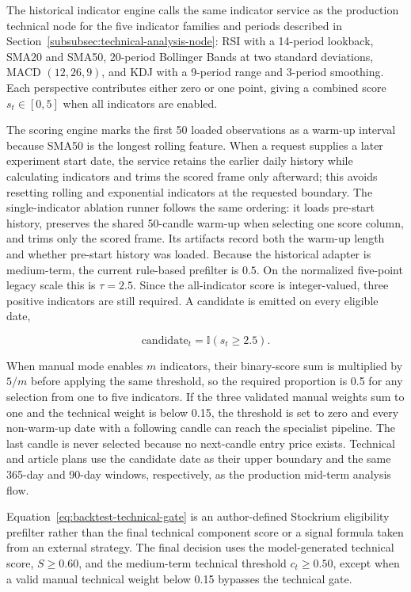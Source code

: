 The historical indicator engine calls the same indicator service as the production technical node for the five indicator families and periods described in Section~\ref{subsubsec:technical-analysis-node}: RSI with a 14-period lookback, SMA20 and SMA50, 20-period Bollinger Bands at two standard deviations, MACD $(12,26,9)$, and KDJ with a 9-period range and 3-period smoothing. Each perspective contributes either zero or one point, giving a combined score $s_t\in[0,5]$ when all indicators are enabled.

The scoring engine marks the first 50 loaded observations as a warm-up interval because SMA50 is the longest rolling feature. When a request supplies a later experiment start date, the service retains the earlier daily history while calculating indicators and trims the scored frame only afterward; this avoids resetting rolling and exponential indicators at the requested boundary. The single-indicator ablation runner follows the same ordering: it loads pre-start history, preserves the shared 50-candle warm-up when selecting one score column, and trims only the scored frame. Its artifacts record both the warm-up length and whether pre-start history was loaded. Because the historical adapter is medium-term, the current rule-based prefilter is $0.5$. On the normalized five-point legacy scale this is $\tau=2.5$. Since the all-indicator score is integer-valued, three positive indicators are still required. A candidate is emitted on every eligible date,

\begin{equation}
    \mathrm{candidate}_t =
    \mathbb{I}\!\left(s_t \geq 2.5\right).
    \label{eq:backtest-technical-gate}
\end{equation}

When manual mode enables $m$ indicators, their binary-score sum is multiplied by $5/m$ before applying the same threshold, so the required proportion is 0.5 for any selection from one to five indicators. If the three validated manual weights sum to one and the technical weight is below 0.15, the threshold is set to zero and every non-warm-up date with a following candle can reach the specialist pipeline. The last candle is never selected because no next-candle entry price exists. Technical and article plans use the candidate date as their upper boundary and the same 365-day and 90-day windows, respectively, as the production mid-term analysis flow.

Equation~\ref{eq:backtest-technical-gate} is an author-defined Stockrium eligibility prefilter rather than the final technical component score or a signal formula taken from an external strategy. The final decision uses the model-generated technical score, $S\geq0.60$, and the medium-term technical threshold $c_t\geq0.50$, except when a valid manual technical weight below 0.15 bypasses the technical gate.

